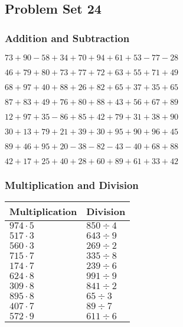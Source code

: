 \hypertarget{problem-set-24}{%
\subsection{Problem Set 24}\label{problem-set-24}}

\hypertarget{addition-and-subtraction}{%
\subsubsection{Addition and
Subtraction}\label{addition-and-subtraction}}

\(73+90-58+34+70+94+61+53-77-28\)

\(46+79+80+73+77+72+63+55+71+49\)

\(68+97+40+88+26+82+65+37+35+65\)

\(87+83+49+76+80+88+43+56+67+89\)

\(12+97+35-86+85+42+79+31+38+90\)

\(30+13+79+21+39+30+95+90+96+45\)

\(89+46+95+20-38-82-43-40+68+88\)

\(42+17+25+40+28+60+89+61+33+42\)

\hypertarget{multiplication-and-division}{%
\subsubsection{Multiplication and
Division}\label{multiplication-and-division}}

\begin{longtable}[]{@{}ll@{}}
\toprule
Multiplication & Division\tabularnewline
\midrule
\endhead
\(974\cdot5\) & \(850÷4\)\tabularnewline
\(517\cdot3\) & \(643÷9\)\tabularnewline
\(560\cdot3\) & \(269÷2\)\tabularnewline
\(715\cdot7\) & \(335÷8\)\tabularnewline
\(174\cdot7\) & \(239÷6\)\tabularnewline
\(624\cdot8\) & \(991÷9\)\tabularnewline
\(309\cdot8\) & \(841÷2\)\tabularnewline
\(895\cdot8\) & \(65÷3\)\tabularnewline
\(407\cdot7\) & \(89÷7\)\tabularnewline
\(572\cdot9\) & \(611÷6\)\tabularnewline
\bottomrule
\end{longtable}
